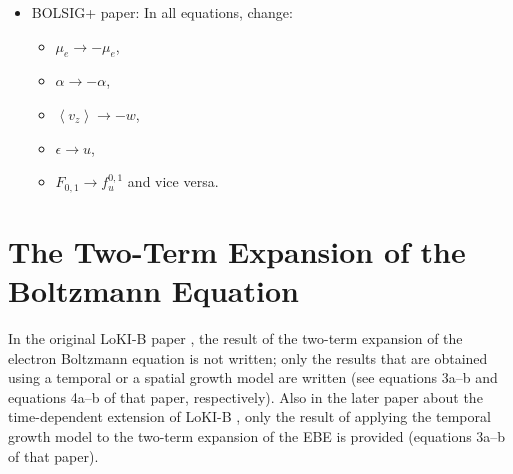\documentclass{book}
\newcommand{\MEAN}[1]{\ensuremath{\!\left\langle{{#1}}\right\rangle}}
\begin{document}
\begin{framed}
\begin{itemize}
\begin{itemize}
			\item $f \rightarrow f^{0}_u$: Unfortunately. there is no symbol
			in LoKI-B for the complete approximation of the distribution
			function, $f^0_u+f^1_u\cos\theta$, since $f$ is used for
			$f^0_u$, the first term of its expansion.
			I find this very confusing, since as a result for example
			$F(u)\neq n_ef(u)$, and hope it can be changed in the LoKI-docs
			and code. In the LoKI-B {\em code}, the name  is used
			for $f^0(u)$, which is confusing for the same reason.
			\item $\tilde{C}^0(u)\rightarrow \gamma S(u)$.
			\item Divide expressions for $D_\epsilon$ and $\mu_\epsilon$ by
				$\MEAN{u}$.
		\end{itemize}
	\item BOLSIG+ paper: In all equations, change:
		\begin{itemize}
			\item $\mu_e\rightarrow -\mu_e$,
			\item $\alpha\rightarrow -\alpha$,
			\item $\MEAN{v_z}\rightarrow -w$,
			\item $\epsilon\rightarrow u$,
			\item $F_{0,1} \rightarrow f^{0,1}_u$ and vice versa.
		\end{itemize}
\end{itemize}
\end{framed}

\section{The Two-Term Expansion of the Boltzmann Equation}

In the original LoKI-B paper \cite{Tejero2019}, the result of the two-term
expansion of the electron Boltzmann equation is not written; only the results
that are obtained using a temporal or a spatial growth model are written (see
equations 3a--b and equations 4a--b of that paper, respectively). Also in the
later paper about the time-dependent extension of LoKI-B \cite{Tejero2021},
only the result of applying the temporal growth model to the two-term
expansion of the EBE is provided (equations 3a--b of that paper).
\end{document}
